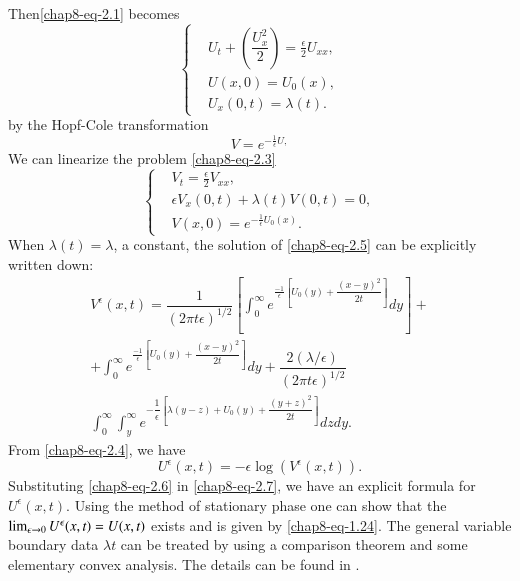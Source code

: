 \newpage
\noindent
Then\pageoriginale \eqref{chap8-eq-2.1} becomes
\begin{equation}\label{chap8-eq-2.3}
\left\{
\begin{aligned}
&U_{t}+\left(\dfrac{U_{x}^{2}}{2}\right) =\tfrac{\epsilon}{2}U_{xx},\\
&U(x, 0)=U_{0}(x),\\
&U_{x}(0,t)= \lambda(t).
\end{aligned}
\right.
\end{equation}
by the Hopf-Cole transformation
\begin{equation}\label{chap8-eq-2.4}
V=e^{-\tfrac{1}{\epsilon}U,}
\end{equation}
We can linearize the problem \eqref{chap8-eq-2.3}
\begin{equation}\label{chap8-eq-2.5}
\left\{
\begin{aligned}
&V_{t} =\tfrac{\epsilon}{2}V_{xx},\\
&\epsilon V_{x}(0, t)+\lambda(t) V(0,t) = 0,\\
&V(x,0)= e^{-\frac{1}{\epsilon}U_{0}(x)}.
\end{aligned}
\right.
\end{equation}
When $\lambda(t)= \lambda$, a constant, the solution of \eqref{chap8-eq-2.5} can be explicitly written down:
\begin{equation}\label{chap8-eq-2.6}
\begin{split}
V^{\epsilon}(x,t) = \dfrac{1}{(2\pi t \epsilon )^{1/2}}\left[\int_{0}^{\infty} e^{\tfrac{-1}{\epsilon}\left[U_{0}(y)+ \dfrac{(x-y)^{2}}{2t}\right]}dy\right] +\\
+ \int_{0}^{\infty}e^{\tfrac{-1}{\epsilon}\left[U_{0}(y)+ \dfrac{(x-y)^{2}}{2t}\right]}dy +
\dfrac{2(\lambda/\epsilon)}{(2\pi t\epsilon)^{1/2}}\\ \int_{0}^{\infty} \int_{y}^{\infty} e^{-\dfrac{1}{\epsilon}\left[\lambda(y-z)+U_{0}(y) +\dfrac{(y+z)^{2}}{2t}\right]}dzdy.
\end{split}
\end{equation}
From \eqref{chap8-eq-2.4}, we have
\begin{equation}\label{chap8-eq-2.7}
U^{\epsilon}(x, t)= -\epsilon\log(V^{\epsilon}(x, t)).
\end{equation}
Substituting \eqref{chap8-eq-2.6} in \eqref{chap8-eq-2.7}, we have an explicit formula for $U^{\epsilon}(x,t)$. Using the method of stationary phase one can show that the $\lim_{\epsilon \rightarrow 0}U^{\epsilon}\break (x, t)=U(x,t)$ exists and is given by \eqref{chap8-eq-1.24}. The general variable boundary data $\lambda{t}$ can be treated by using a comparison theorem and some elementary convex analysis. The details can be found in \cite{chap8-key3}.

